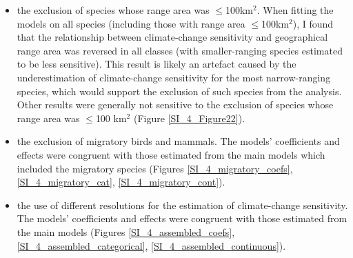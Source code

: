 \begin{itemize}
\item 
the exclusion of species whose range area was $\leq$100km$^2$. When fitting the models on all species (including those with range area $\leq$100km$^2$), I found that the relationship between climate-change sensitivity and geographical range area was reversed in all classes (with smaller-ranging species estimated to be less sensitive). This result is likely an artefact caused by the underestimation of climate-change sensitivity for the most narrow-ranging species, which would support the exclusion of such species from the analysis. Other results were generally not sensitive to the exclusion of species whose range area was $\leq$100 km$^2$ (Figure \ref{SI_4_Figure22}).

\item 
the exclusion of migratory birds and mammals. The models' coefficients and effects were congruent with those estimated from the main models which included the migratory species (Figures \ref{SI_4_migratory_coefs}, \ref{SI_4_migratory_cat}, \ref{SI_4_migratory_cont}).

\item 
the use of different resolutions for the estimation of climate-change sensitivity. The models' coefficients and effects were congruent with those estimated from the main models (Figures \ref{SI_4_assembled_coefs}, \ref{SI_4_assembled_categorical}, \ref{SI_4_assembled_continuous}).
\end{itemize} 


\clearpage

